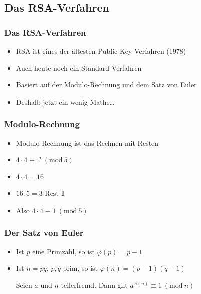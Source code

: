 \documentclass{beamer}
\begin{document}
\subsection{Das RSA-Verfahren}

\begin{frame}
\frametitle{Das RSA-Verfahren}

	\begin{itemize}
		\item RSA ist eines der ältesten Public-Key-Verfahren (1978)
		\item Auch heute noch ein Standard-Verfahren
		\item Basiert auf der Modulo-Rechnung und dem Satz von Euler
		\item Deshalb jetzt ein wenig Mathe\dots
	\end{itemize}
\end{frame}

\begin{frame}
\frametitle{Modulo-Rechnung}
	\begin{itemize}
		\item Modulo-Rechnung ist das Rechnen mit Resten
		\item \(4 \cdot 4 \equiv \ ?\ (\text{mod}\ 5) \)
\pause		\item \(4 \cdot 4 = 16\)
\pause		\item \(16 : 5 = 3 \text{ Rest } \textbf{1}\)
\pause		\item Also \(4 \cdot 4 \equiv 1\ (\text{mod}\ 5) \)
	\end{itemize}
\end{frame}


\begin{frame}
\frametitle{Der Satz von Euler}

\begin{itemize}
	\begin{definition}
		\(\varphi(n) = \) Anzahl der zu \(n\) teilerfremden Zahlen \(\leq n\)
	\end{definition}
\pause	\item Ist \(p\) eine Primzahl, so ist \(\varphi(p) = p-1\)
	\item Ist \(n=pq\), \(p,q\) prim, so ist \(\varphi(n) = (p-1)(q-1)\)

\pause	\begin{theorem}
		Seien \(a\) und \(n\) teilerfremd.
		Dann gilt \(a^{\varphi(n)} \equiv 1 \ (\text{mod}\ n)\)
	\end{theorem}
\end{itemize}
\end{frame}
\end{document}
